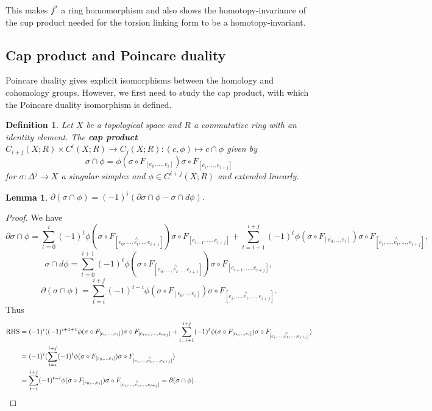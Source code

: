 \documentclass{article}
\newtheorem{definition}[theorem]{Definition}
\newtheorem{lemma}[theorem]{Lemma}
\begin{document}
\noindent This makes $f^*$ a ring homomorphism and also shows the homotopy-invariance of the cup product needed for the torsion linking form to be a homotopy-invariant.


\subsection{Cap product and Poincare duality}
Poincare duality gives explicit isomorphisms between the homology and cohomology groups. However, we first need to study the cap product, with which the Poincare duality isomorphism is defined.
\begin{definition}
Let $X$ be a topological space and $R$ a commutative ring with an identity element. The \textbf{cap product} $C_{i+j}(X;R)\times C^i(X;R)\to C_j(X;R):(c,\phi)\mapsto c\cap\phi$ given by \[\sigma\cap\phi=\phi(\sigma\circ F_{[e_0,...,e_i]})\sigma\circ F_{[e_i,...,e_{i+j}]}\] for $\sigma\colon\Delta^j\to X$ a singular simplex and $\phi\in C^{i+j}(X;R)$ and extended linearly.
\end{definition}

\begin{lemma}
$\partial(\sigma\cap\phi)=(-1)^i(\partial\sigma\cap\phi-\sigma\cap d\phi)$.
\end{lemma}
\begin{proof}
We have
\[\partial\sigma\cap\phi=\sum_{t=0}^i(-1)^t\phi(\sigma\circ F_{[e_0,...,\overset{\wedge}{e_t},..,e_{i+1}]})\sigma\circ F_{[e_{i+1},...,e_{i+j}]}+\sum_{t=i+1}^{i+j}(-1)^t\phi(\sigma\circ F_{[e_0,..,e_{i}]})\sigma\circ F_{[e_{i},...,\overset{\wedge}{e_t},...,e_{i+j}]},\]
\[\sigma\cap d\phi=\sum_{t=0}^{i+1}(-1)^t\phi(\sigma\circ F_{[e_0,...,\overset{\wedge}{e_t},..,e_{i+1}]})\sigma\circ F_{[e_{i+1},...,e_{i+j}]},\]
\[\partial(\sigma\cap\phi)=\sum_{t=i}^{i+j}(-1)^{t-i}\phi(\sigma\circ F_{[e_0,..,e_{i}]})\sigma\circ F_{[e_{i},...,\overset{\wedge}{e_t},...,e_{i+j}]}.\] Thus \begin{align*}\text{RHS}&=(-1)^i((-1)^{i+1+1}\phi(\sigma\circ F_{[e_0,...,e_i]})\sigma\circ F_{[e_{i+1},...,e_{i+j}]}+\sum_{t=i+1}^{i+j}(-1)^t\phi(\sigma\circ F_{[e_0,..,e_{i}]})\sigma\circ F_{[e_{i},...,\overset{\wedge}{e_t},...,e_{i+j}]})\\&=(-1)^i(\sum_{t=i}^{i+j}(-1)^t\phi(\sigma\circ F_{[e_0,..,e_{i}]})\sigma\circ F_{[e_{i},...,\overset{\wedge}{e_t},...,e_{i+j}]})\\&=\sum_{t=i}^{i+j}(-1)^{t-i}\phi(\sigma\circ F_{[e_0,..,e_{i}]})\sigma\circ F_{[e_{i},...,\overset{\wedge}{e_t},...,e_{i+j}]}=\partial(\sigma\cap\phi).\qedhere\end{align*}
\end{proof}
\end{document}
